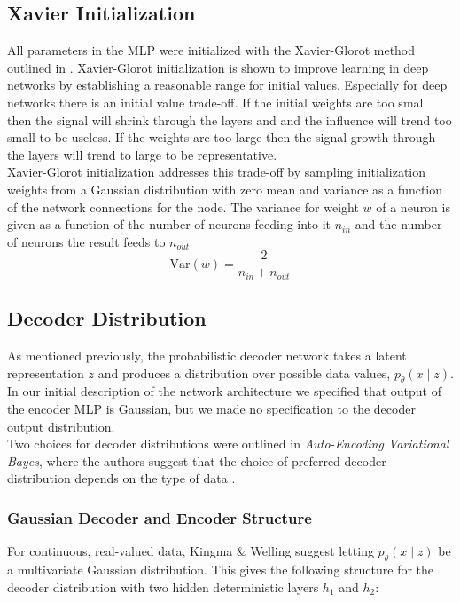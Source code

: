 \documentclass{article} %
\begin{document}
\subsection{Xavier Initialization}
All parameters in the MLP were initialized with the Xavier-Glorot method outlined in \cite{Glorot2010}. Xavier-Glorot initialization is shown to improve learning in deep networks by establishing a reasonable range for initial values. Especially for deep networks there is an initial value trade-off. If the initial weights are too small then the signal will shrink through the layers and and the influence will trend too small to be useless. If the weights are too large then the signal growth through the layers will trend to large to be representative.\\
Xavier-Glorot initialization addresses this trade-off by sampling initialization weights from a Gaussian distribution with zero mean and variance as a function of the network connections for the node. The variance for weight $w$  of a neuron is given as a function of the number of neurons feeding into it $n_{in}$ and the number of neurons the result feeds to $n_{out}$
\begin{equation*}
    \text{Var}(w) = \frac{2}{n_{in}+n_{out}}
\end{equation*}


\subsection{Decoder Distribution}



As mentioned previously, the probabilistic decoder network takes a latent representation $z$ and produces a distribution over possible data values, ${p_\theta(x\mid z)}$. In our initial description of the network architecture we specified that output of the encoder MLP is Gaussian, but we made no specification to the decoder output distribution. \\
Two choices for decoder distributions were outlined in \textit{Auto-Encoding Variational Bayes}, where the authors suggest that the choice of preferred decoder distribution depends on the type of data \cite{Kingma2013}. \\

\subsubsection{Gaussian Decoder and Encoder Structure}
For continuous, real-valued data, Kingma \& Welling suggest letting ${p_\theta(x\mid z)}$ be a multivariate Gaussian distribution. This gives the following structure for the decoder distribution with two hidden deterministic layers $h_1$ and $h_2$:
\end{document}
